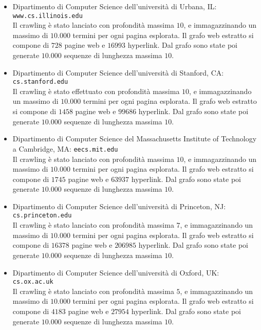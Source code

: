 \begin{itemize}

\item Dipartimento di Computer Science dell'università di Urbana, IL:\\
\texttt{www.cs.illinois.edu}\\
Il crawling è stato lanciato con profondità massima $10$, e immagazzinando un massimo di $10.000$ termini per ogni pagina esplorata. Il grafo web estratto si compone di $728$ pagine web e $16993$ hyperlink. Dal grafo sono state poi generate $10.000$ sequenze di lunghezza massima $10$.

\item Dipartimento di Computer Science dell'università di Stanford, CA: \texttt{cs.stanford.edu} \\Il crawling è stato effettuato con profondità massima $10$, e immagazzinando un massimo di $10.000$ termini per ogni pagina esplorata. Il grafo web estratto si compone di $1458$ pagine web e $99686$ hyperlink. Dal grafo sono state poi generate $10.000$ sequenze di lunghezza massima $10$.

\item Dipartimento di Computer Science del  Massachusetts Institute of Technology a Cambridge, MA: \texttt{eecs.mit.edu} \\ Il crawling è stato lanciato con profondità massima $10$, e immagazzinando un massimo di $10.000$ termini per ogni pagina esplorata. Il grafo web estratto si compone di $1745$ pagine web e $63937$ hyperlink. Dal grafo sono state poi generate $10.000$ sequenze di lunghezza massima $10$.

\item Dipartimento di Computer Science dell'università di Princeton, NJ: \texttt{cs.princeton.edu} \\ Il crawling è stato lanciato con profondità massima $7$, e immagazzinando un massimo di $10.000$ termini per ogni pagina esplorata. Il grafo web estratto si compone di $16378$ pagine web e $206985$ hyperlink. Dal grafo sono state poi generate $10.000$ sequenze di lunghezza massima $10$.

\item Dipartimento di Computer Science dell'università di Oxford, UK:\\ \texttt{cs.ox.ac.uk} \\ Il crawling è stato lanciato con profondità massima $5$, e immagazzinando un massimo di $10.000$ termini per ogni pagina esplorata. Il grafo web estratto si compone di $4183$ pagine web e $27954$ hyperlink. Dal grafo sono state poi generate $10.000$ sequenze di lunghezza massima $10$.

\end{itemize}

